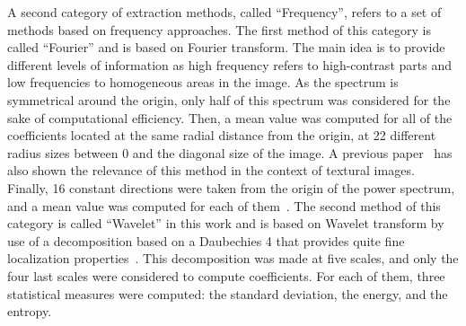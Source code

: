 \documentclass[journal,article,accept,moreauthors,pdftex, applsci]{Definitions/mdpi}
\begin{document}
A second category of extraction methods, called “Frequency”, refers to a set of methods based on frequency approaches. The first method of this category is called “Fourier” and is based on Fourier transform. The main idea is to provide different levels of information as high frequency refers to high-contrast parts and low frequencies to homogeneous areas in the image. As the spectrum is symmetrical around the origin, only half of this spectrum was considered for the sake of computational efficiency. Then, a mean value was computed for all of the coefficients located at the same radial distance from the origin, at 22 different radius sizes between 0 and the diagonal size of the image. A previous paper~\cite{Smach2008a} has also shown the relevance of this method in the context of textural images. Finally, 16 constant directions were taken from the origin of the power spectrum, and a mean value was computed for each of them~\cite{Wiltgen2008}. The second method of this category is called “Wavelet” in this work and is based on Wavelet transform by use of a decomposition based on a Daubechies 4 that provides quite fine localization properties~\cite{Wiltgen2008}. This decomposition was made at five scales, and only the four last scales were considered to compute coefficients. For each of them, three statistical measures were computed: the standard deviation, the energy, and the entropy.\par
                    
\end{document}
